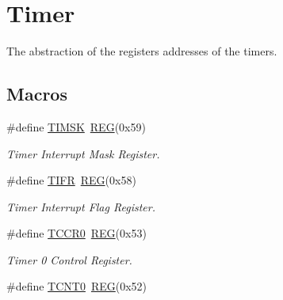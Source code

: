 \hypertarget{group__TIMERMCAL}{\section{Timer}
\label{group__TIMERMCAL}
}


The abstraction of the registers addresses of the timers.  


\subsection*{Macros}
\begin{DoxyCompactItemize}
\item 
\hypertarget{group__TIMERMCAL_gafe70374b69bd639778cb1fd507169c07}{\#define \hyperlink{group__TIMERMCAL_gafe70374b69bd639778cb1fd507169c07}{T\+I\+M\+S\+K}~\hyperlink{group__MCAL_ga72e45020e46f285689db51c46f273403}{R\+E\+G}(0x59)}\label{group__TIMERMCAL_gafe70374b69bd639778cb1fd507169c07}

\begin{DoxyCompactList}\small\item\em Timer Interrupt Mask Register. \end{DoxyCompactList}\item 
\hypertarget{group__TIMERMCAL_ga62a88f276045b4f7cc16a8c11bb6a34a}{\#define \hyperlink{group__TIMERMCAL_ga62a88f276045b4f7cc16a8c11bb6a34a}{T\+I\+F\+R}~\hyperlink{group__MCAL_ga72e45020e46f285689db51c46f273403}{R\+E\+G}(0x58)}\label{group__TIMERMCAL_ga62a88f276045b4f7cc16a8c11bb6a34a}

\begin{DoxyCompactList}\small\item\em Timer Interrupt Flag Register. \end{DoxyCompactList}\item 
\hypertarget{group__TIMERMCAL_ga0df03483d490aca1a62540889fe14be4}{\#define \hyperlink{group__TIMERMCAL_ga0df03483d490aca1a62540889fe14be4}{T\+C\+C\+R0}~\hyperlink{group__MCAL_ga72e45020e46f285689db51c46f273403}{R\+E\+G}(0x53)}\label{group__TIMERMCAL_ga0df03483d490aca1a62540889fe14be4}

\begin{DoxyCompactList}\small\item\em Timer 0 Control Register. \end{DoxyCompactList}\item 
\hypertarget{group__TIMERMCAL_ga1eef2c2d5220a80989476157c04fb1aa}{\#define \hyperlink{group__TIMERMCAL_ga1eef2c2d5220a80989476157c04fb1aa}{T\+C\+N\+T0}~\hyperlink{group__MCAL_ga72e45020e46f285689db51c46f273403}{R\+E\+G}(0x52)}\label{group__TIMERMCAL_ga1eef2c2d5220a80989476157c04fb1aa}


\end{DoxyCompactItemize}
